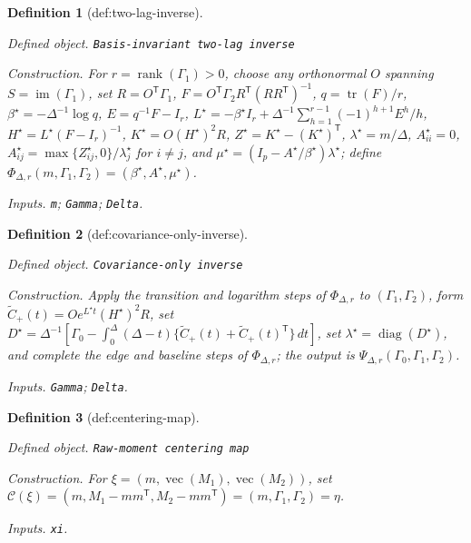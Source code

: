 \documentclass{article}
\newtheorem{definition}{Definition}
\begin{document}
\begin{definition}[def:two-lag-inverse]\label{def:two-lag-inverse}
\par\smallskip\noindent\emph{Defined object.} \texttt{Basis-\allowbreak{}invariant two-\allowbreak{}lag inverse}
\par\smallskip\noindent\emph{Construction.} For \(r=\operatorname{rank}(\Gamma_1)>0\), choose any orthonormal \(O\) spanning \(S=\operatorname{im}(\Gamma_1)\), set \(R=O^{\mathsf T}\Gamma_1\), \(F=O^{\mathsf T}\Gamma_2R^{\mathsf T}(RR^{\mathsf T})^{-1}\), \(q=\operatorname{tr}(F)/r\), \(\beta^\star=-\Delta^{-1}\log q\), \(E=q^{-1}F-I_r\), \(L^\star=-\beta^\star I_r+\Delta^{-1}\sum_{h=1}^{r-1}(-1)^{h+1}E^h/h\), \(H^\star=L^\star(F-I_r)^{-1}\), \(K^\star=O(H^\star)^2R\), \(Z^\star=K^\star-(K^\star)^{\mathsf T}\), \(\lambda^\star=m/\Delta\), \(A_{ii}^\star=0\), \(A_{ij}^\star=\max\{Z_{ij}^\star,0\}/\lambda_j^\star\) for \(i\neq j\), and \(\mu^\star=(I_p-A^\star/\beta^\star)\lambda^\star\); define \(\Phi_{\Delta,r}(m,\Gamma_1,\Gamma_2)=(\beta^\star,A^\star,\mu^\star)\).
\par\smallskip\noindent\emph{Inputs.} \texttt{m}; \texttt{Gamma}; \texttt{Delta}.
\end{definition}

\begin{definition}[def:covariance-only-inverse]\label{def:covariance-only-inverse}
\par\smallskip\noindent\emph{Defined object.} \texttt{Covariance-\allowbreak{}only inverse}
\par\smallskip\noindent\emph{Construction.} Apply the transition and logarithm steps of \(\Phi_{\Delta,r}\) to \((\Gamma_1,\Gamma_2)\), form \(\widetilde C_{+}(t)=Oe^{L^\star t}(H^\star)^2R\), set \(D^\star=\Delta^{-1}[\Gamma_0-\int_0^\Delta(\Delta-t)\{\widetilde C_{+}(t)+\widetilde C_{+}(t)^{\mathsf T}\}\,dt]\), set \(\lambda^\star=\operatorname{diag}(D^\star)\), and complete the edge and baseline steps of \(\Phi_{\Delta,r}\); the output is \(\Psi_{\Delta,r}(\Gamma_0,\Gamma_1,\Gamma_2)\).
\par\smallskip\noindent\emph{Inputs.} \texttt{Gamma}; \texttt{Delta}.
\end{definition}

\begin{definition}[def:centering-map]\label{def:centering-map}
\par\smallskip\noindent\emph{Defined object.} \texttt{Raw-\allowbreak{}moment centering map}
\par\smallskip\noindent\emph{Construction.} For \(\xi=(m,\operatorname{vec}(M_1),\operatorname{vec}(M_2))\), set \(\mathcal C(\xi)=(m,M_1-mm^{\mathsf T},M_2-mm^{\mathsf T})=(m,\Gamma_1,\Gamma_2)=\eta\).
\par\smallskip\noindent\emph{Inputs.} \texttt{xi}.
\end{definition}
\end{document}
